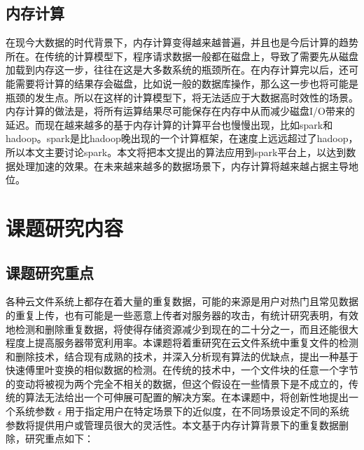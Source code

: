 \subsection{内存计算}
在现今大数据的时代背景下，内存计算变得越来越普遍，并且也是今后计算的趋势所在。在传统的计算模型下，程序请求数据一般都在磁盘上，导致了需要先从磁盘加载到内存这一步，往往在这是大多数系统的瓶颈所在。在内存计算完以后，还可能需要将计算的结果存会磁盘，比如说一般的数据库操作，那么这一步也将可能是瓶颈的发生点。所以在这样的计算模型下，将无法适应于大数据高时效性的场景。内存计算的做法是，将所有运算结果尽可能保存在内存中从而减少磁盘I/O带来的延迟。而现在越来越多的基于内存计算的计算平台也慢慢出现，比如spark和hadoop。spark是比hadoop晚出现的一个计算框架，在速度上远远超过了hadoop，所以本文主要讨论spark。本文将把本文提出的算法应用到spark平台上，以达到数据处理加速的效果。在未来越来越多的数据场景下，内存计算将越来越占据主导地位。

\section{课题研究内容}
\subsection{课题研究重点}
\label{sec:point1}
各种云文件系统上都存在着大量的重复数据，可能的来源是用户对热门且常见数据的重复上传，也有可能是一些恶意上传者对服务器的攻击，有统计研究表明，有效地检测和删除重复数据，将使得存储资源减少到现在的二十分之一，而且还能很大程度上提高服务器带宽利用率。本课题将着重研究在云文件系统中重复文件的检测和删除技术，结合现有成熟的技术，并深入分析现有算法的优缺点，提出一种基于快速傅里叶变换的相似数据的检测。在传统的技术中，一个文件块的任意一个字节的变动将被视为两个完全不相关的数据，但这个假设在一些情景下是不成立的，传统的算法无法给出一个可伸展可配置的解决方案。在本课题中，将创新性地提出一个系统参数 $\epsilon$ 用于指定用户在特定场景下的近似度，在不同场景设定不同的系统参数将提供用户或管理员很大的灵活性。本文基于内存计算背景下的重复数据删除，研究重点如下：

